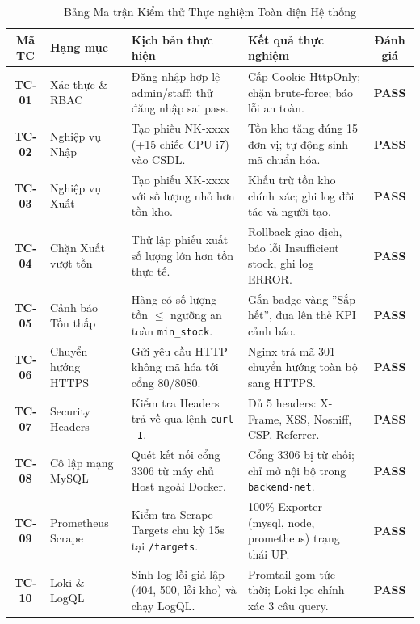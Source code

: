 \documentclass[12pt,a4paper,oneside]{report}
\newcommand{\badgepass}{\colorbox{passbg}{\textcolor{passgreen}{\textbf{PASS}}}}
\begin{document}
\begin{table}[H]
\centering
\small
\renewcommand{\arraystretch}{1.25}
\begin{tabularx}{\linewidth}{|c|l|X|X|c|}
\hline
\rowcolor{codebg}
\textbf{Mã TC} & \textbf{Hạng mục} & \textbf{Kịch bản thực hiện} & \textbf{Kết quả thực nghiệm} & \textbf{Đánh giá} \\
\hline
\textbf{TC-01} & Xác thực \& RBAC & Đăng nhập hợp lệ admin/staff; thử đăng nhập sai pass. & Cấp Cookie HttpOnly; chặn brute-force; báo lỗi an toàn. & \badgepass \\
\hline
\textbf{TC-02} & Nghiệp vụ Nhập & Tạo phiếu NK-xxxx (+15 chiếc CPU i7) vào CSDL. & Tồn kho tăng đúng 15 đơn vị; tự động sinh mã chuẩn hóa. & \badgepass \\
\hline
\textbf{TC-03} & Nghiệp vụ Xuất & Tạo phiếu XK-xxxx với số lượng nhỏ hơn tồn kho. & Khấu trừ tồn kho chính xác; ghi log đối tác và người tạo. & \badgepass \\
\hline
\textbf{TC-04} & Chặn Xuất vượt tồn & Thử lập phiếu xuất số lượng lớn hơn tồn thực tế. & Rollback giao dịch, báo lỗi Insufficient stock, ghi log ERROR. & \badgepass \\
\hline
\textbf{TC-05} & Cảnh báo Tồn thấp & Hàng có số lượng tồn $\le$ ngưỡng an toàn \texttt{min\_stock}. & Gắn badge vàng ''Sắp hết'', đưa lên thẻ KPI cảnh báo. & \badgepass \\
\hline
\textbf{TC-06} & Chuyển hướng HTTPS & Gửi yêu cầu HTTP không mã hóa tới cổng 80/8080. & Nginx trả mã 301 chuyển hướng toàn bộ sang HTTPS. & \badgepass \\
\hline
\textbf{TC-07} & Security Headers & Kiểm tra Headers trả về qua lệnh \texttt{curl -I}. & Đủ 5 headers: X-Frame, XSS, Nosniff, CSP, Referrer. & \badgepass \\
\hline
\textbf{TC-08} & Cô lập mạng MySQL & Quét kết nối cổng 3306 từ máy chủ Host ngoài Docker. & Cổng 3306 bị từ chối; chỉ mở nội bộ trong \texttt{backend-net}. & \badgepass \\
\hline
\textbf{TC-09} & Prometheus Scrape & Kiểm tra Scrape Targets chu kỳ 15s tại \texttt{/targets}. & 100\% Exporter (mysql, node, prometheus) trạng thái UP. & \badgepass \\
\hline
\textbf{TC-10} & Loki \& LogQL & Sinh log lỗi giả lập (404, 500, lỗi kho) và chạy LogQL. & Promtail gom tức thời; Loki lọc chính xác 3 câu query. & \badgepass \\
\hline
\end{tabularx}
\caption{Bảng Ma trận Kiểm thử Thực nghiệm Toàn diện Hệ thống}
\label{tab:test_matrix}
\end{table}
\end{document}
